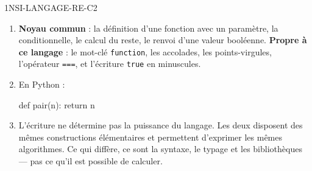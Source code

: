 \begin{corrige}{1NSI-LANGAGE-RE-C2}
\begin{enumerate}
  \item \textbf{Noyau commun} : la définition d'une fonction avec un paramètre, la
        conditionnelle, le calcul du reste, le renvoi d'une valeur booléenne.
        \textbf{Propre à ce langage} : le mot-clé \lstinline{function}, les accolades, les
        points-virgules, l'opérateur \lstinline{===}, et l'écriture \lstinline{true}
        en minuscules.
  \item En Python :
        \begin{python}
def pair(n):
    return n %
        \end{python}
  \item L'écriture ne détermine pas la puissance du langage. Les deux disposent des mêmes
        constructions élémentaires et permettent d'exprimer les mêmes algorithmes. Ce qui
        diffère, ce sont la syntaxe, le typage et les bibliothèques — pas ce qu'il est
        possible de calculer.
\end{enumerate}
\end{corrige}
